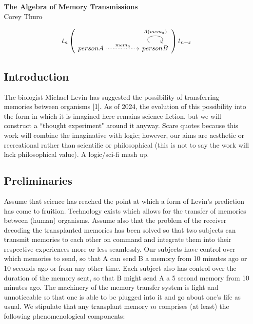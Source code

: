 \documentclass{article}
\begin{document}
\begin{center}
    {\Large\bfseries The Algebra of Memory Transmissions}\\ 
    \vspace{.5em}
    \normalsize Corey Thuro


\vspace{1em}

\[
t_n
\begin{pmatrix}
\begin{tikzcd}
    personA && 
    personB \arrow[loop, distance=2em, "{A(mem_a)}" , out=135, in=45] {}
    \arrow["{mem_a}", dotted, from=1-1, to=1-3]
\end{tikzcd}
\end{pmatrix}
t_{n+x}
\]
\end{center}

\subsection*{Introduction}
The biologist Michael Levin has suggested the possibility of transferring memories between organisms [1]. As of 2024, the evolution of this possibility into the form in which it is imagined here remains science fiction, but we will construct a ``thought experiment" around it anyway. Scare quotes because this work will combine the imaginative with logic; however, our aims are aesthetic or recreational rather than scientific or philosophical (this is not to say the work will lack philosophical value). A logic/sci-fi mash up.

\subsection*{Preliminaries}
Assume that science has reached the point at which a form of Levin's prediction has come to fruition. Technology exists which allows for the transfer of memories between (human) organisms. Assume also that the problem of the receiver decoding the transplanted memories has been solved so that two subjects can transmit memories to each other on command and integrate them into their respective experiences more or less seamlessly. Our subjects have control over which memories to send, so that A can send B a memory from 10 minutes ago or 10 seconds ago or from any other time. Each subject also has control over the duration of the memory sent, so that B might send A a 5 second memory from 10 minutes ago. The machinery of the memory transfer system is light and unnoticeable so that one is able to be plugged into it and go about one's life as usual. We stipulate that any transplant memory $m$ comprises (at least) the following phenomenological components:
\end{document}
